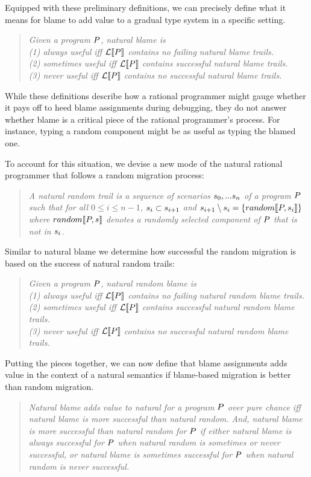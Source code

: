 Equipped with these preliminary definitions, we can precisely define what it means
for blame to add value to a gradual type system in a specific setting. 
\begin{quote}
\it
Given a program $P$, natural blame is\\
(1) \emph{always useful} iff $\mathcal{L}\llbracket P\rrbracket$ contains no failing natural blame trails.\\
(2) \emph{sometimes useful} iff $\mathcal{L}\llbracket P\rrbracket$ contains successful natural blame trails.\\
(3) \emph{never useful} iff $\mathcal{L}\llbracket P\rrbracket$ contains no successful natural blame
trails.\\
\end{quote}

While these definitions describe how a rational programmer might gauge whether it
pays off to heed blame assignments during debugging, they do not answer whether
blame is a critical piece of the rational programmer's process.  For instance,
typing a random component might be as useful as typing the blamed one.

To account for this situation, we devise a new mode of the natural rational
programmer that follows a random migration process:
\begin{quote}
\it A natural random trail is a sequence of scenarios $s_0,...s_n$ of a
program $P$ such that for all $0 \leq i \leq n - 1$, $s_i \subset
s_{i+1}$ and $s_{i+1} \setminus s_i = \{random\llbracket P, s_i\rrbracket\}$
where $random\llbracket P, s\rrbracket$ denotes a randomly selected component of $P$
that is not in $s_i$.
\end{quote}
Similar to natural blame we determine how successful the random
migration is based on the success of natural random trails: 
\begin{quote}
\it
Given a program $P$, natural random blame is\\
(1) \emph{always useful} iff $\mathcal{L}\llbracket P\rrbracket$ contains no failing natural random blame trails.\\
(2) \emph{sometimes useful} iff $\mathcal{L}\llbracket P\rrbracket$ contains successful natural random blame trails.\\
(3) \emph{never useful} iff $\mathcal{L}\llbracket P\rrbracket$ contains no successful natural
random blame trails.\\
\end{quote}

Putting the pieces together, we can now define that blame assignments adds value in
the context of a natural semantics if blame-based migration is better than random
migration.
\begin{quote}
\it Natural blame adds value to natural for a program $P$ over pure chance iff
  natural blame is more successful than natural random. And, natural blame is more
  successful than natural random for $P$ if either natural blame is always
  successful for $P$ when natural random is sometimes or never successful, or
  natural blame is sometimes successful for $P$ when natural random is never
  successful.
\end{quote}

